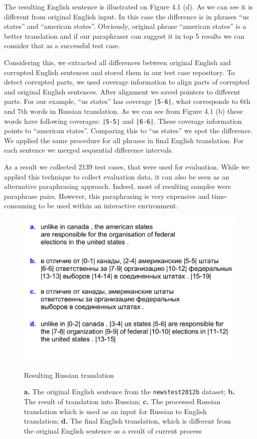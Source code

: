 The resulting English sentence is illustrated on Figure 4.1 (d). As we can see it is different from original English input. In this case the difference is in phrases ``us states'' and ``american states''. Obviously, original phrase ``american states'' is a better translation and if our paraphraser can suggest it in top 5 results we can consider that as a successful test case. 

Considering this, we extracted all differences between original English and corrupted English sentences and stored them in our test case repository. To detect corrupted parts, we used coverage information to align parts of corrupted and original English sentences. After alignment we saved pointers to different parts. For our example, ``us states'' has coverage \texttt{|5-6|}, what corresponds to 6th and 7th words in Russian translation. As we can see from Figure 4.1 (b) these words have following coverages: \texttt{|5-5|} and \texttt{|6-6|}. These coverage information points to ``american states''. Comparing this to ``us states'' we spot the difference. We applied the same procedure for all phrases in final English translation. For each sentence we merged sequential difference intervals.

As a result we collected 2139 test cases, that were used for evaluation. While we applied this technique to collect evaluation data, it can also be seen as an alternative paraphrasing approach. Indeed, most of resulting samples were paraphrase pairs. However, this paraphrasing is very expensive and time-consuming to be used within an interactive environment. 

\begin{figure}
 \centering 
 \includegraphics[scale=0.75]{g/rus-sample1.pdf}
 \caption{Resulting Russian translation}
 \caption*{\textbf{a.} The original English sentence from the \texttt{newstest2012b} dataset; \textbf{b.} The result of translation into Russian; \textbf{c.} The processed Russian translation which is used as an input for Russian to English translation; \textbf{d.} The final English translation, which is different from the original English sentence as a result of current process }
\end{figure}

